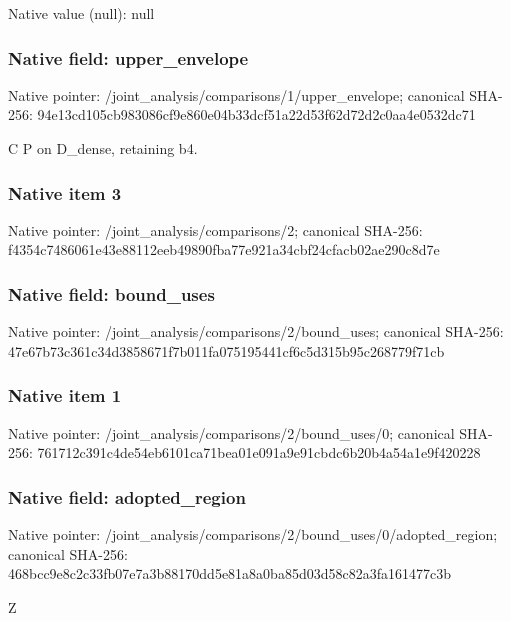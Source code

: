 \documentclass[10pt,a4paper]{article}
\begin{document}
Native value (null): null

\subsubsection{Native field: upper\_\allowbreak{}envelope}
Native pointer: /joint\_\allowbreak{}analysis/comparisons/1/upper\_\allowbreak{}envelope; canonical SHA-256: 94e13cd105cb983086cf9e860e04b33dcf51a22d53f62d72d2c0aa4e0532dc71

\begingroup\raggedright\sloppy C P on D\_\allowbreak{}dense,\allowbreak{} retaining b4.\par\endgroup

\subsubsection{Native item 3}
Native pointer: /joint\_\allowbreak{}analysis/comparisons/2; canonical SHA-256: f4354c7486061e43e88112eeb49890fba77e921a34cbf24cfacb02ae290c8d7e

\subsubsection{Native field: bound\_\allowbreak{}uses}
Native pointer: /joint\_\allowbreak{}analysis/comparisons/2/bound\_\allowbreak{}uses; canonical SHA-256: 47e67b73c361c34d3858671f7b011fa075195441cf6c5d315b95c268779f71cb

\subsubsection{Native item 1}
Native pointer: /joint\_\allowbreak{}analysis/comparisons/2/bound\_\allowbreak{}uses/0; canonical SHA-256: 761712c391c4de54eb6101ca71bea01e091a9e91cbdc6b20b4a54a1e9f420228

\subsubsection{Native field: adopted\_\allowbreak{}region}
Native pointer: /joint\_\allowbreak{}analysis/comparisons/2/bound\_\allowbreak{}uses/0/adopted\_\allowbreak{}region; canonical SHA-256: 468bcc9e8c2c33fb07e7a3b88170dd5e81a8a0ba85d03d58c82a3fa161477c3b

\begingroup\raggedright\sloppy Z\par\endgroup
\end{document}
